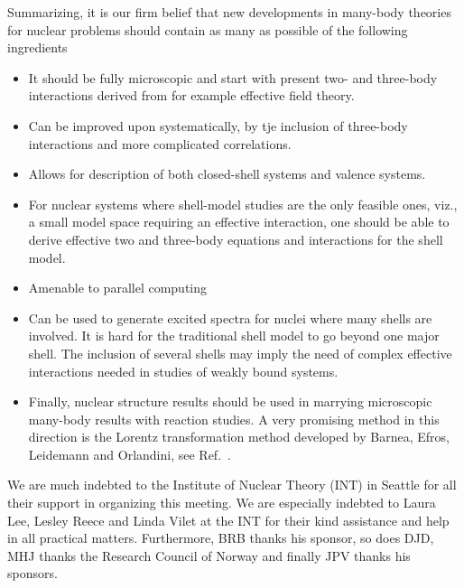 \documentclass[12pt]{iopart}
\begin{document}
Summarizing, it is our firm belief that new developments in many-body theories
for nuclear problems should contain as many as possible of the following ingredients
\begin{itemize}
\item
It should be fully microscopic and start with present two- and three-body
interactions derived from for example effective field theory.
\item Can be improved upon systematically,  by tje inclusion of
three-body interactions and more complicated correlations.
\item Allows for description of both closed-shell systems and valence systems.
\item For nuclear systems where shell-model studies are the only feasible ones,
viz., a small model space requiring an effective interaction, one should be able to
derive  effective two and three-body equations and interactions for the shell
model.
\item Amenable to parallel computing
\item Can be used to generate excited spectra for nuclei  
where many shells are involved. It is hard for the traditional shell model
to go beyond one major shell.
The inclusion of several shells may imply the need of  complex effective interactions
needed in studies of weakly bound systems.
\item Finally, nuclear structure results should be used in marrying microscopic 
many-body results with 
reaction studies. A very promising method in this direction is the Lorentz transformation
method developed by Barnea, Efros, Leidemann and Orlandini, see Ref.~\cite{giusi}.
\end{itemize}


\ack
We are much indebted to the Institute of Nuclear Theory (INT) in Seattle for 
all their support
in organizing this meeting. We are especially indebted 
to Laura Lee, Lesley Reece and Linda Vilet at the INT for their 
kind assistance and help in all practical matters. Furthermore, BRB 
thanks his sponsor, so does DJD, 
MHJ thanks the Research Council of Norway and finally JPV thanks his sponsors.
\end{document}
